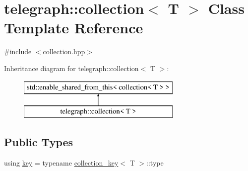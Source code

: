 \hypertarget{classtelegraph_1_1collection}{}\section{telegraph\+:\+:collection$<$ T $>$ Class Template Reference}
\label{classtelegraph_1_1collection}


{\ttfamily \#include $<$collection.\+hpp$>$}

Inheritance diagram for telegraph\+:\+:collection$<$ T $>$\+:\begin{figure}[H]
\begin{center}
\leavevmode
\includegraphics[height=2.000000cm]{classtelegraph_1_1collection}
\end{center}
\end{figure}
\subsection*{Public Types}
\begin{DoxyCompactItemize}
\item 
using \hyperlink{classtelegraph_1_1collection_a7d1c05b1bdcbe95a3127122969e14173}{key} = typename \hyperlink{structtelegraph_1_1collection__key}{collection\+\_\+key}$<$ T $>$\+::type
\end{DoxyCompactItemize}
